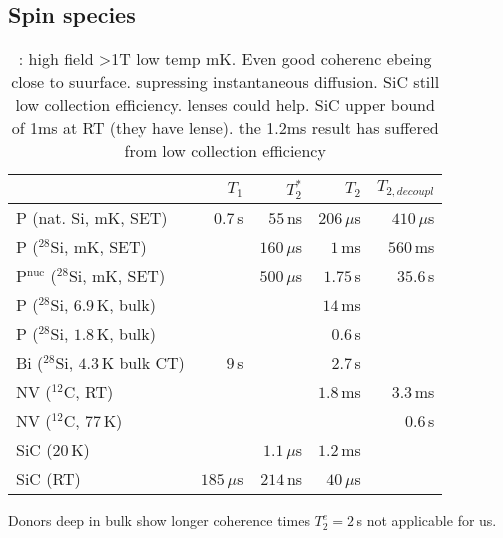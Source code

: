
\subsection{Spin species}


\begin{table}[H]
\begin{tabular}{lrrrr}
	& $T_1$ & $T_2^{*}$ & $T_2$ & $T_{2, decoupl}$ \\ \hline
P (nat. Si, mK, SET) \cite{Pla2012}& $0.7\, $s & $55\, $ns  & $206\, \mu$s & $410\, \mu$s  \\
P ($^{28}$Si, mK, SET) \cite{Muhonen2014}&  & $160\, \mu$s  & $1\, $ms & $560\, $ms \\
P$^{\text{nuc}}$ ($^{28}$Si, mK, SET) \cite{Muhonen2014}& & $500\, \mu$s & $1.75\, $s & $35.6\, $s \\
P ($^{28}$Si, $6.9\, $K, bulk) \cite{Morley2010}& &  & $14\, $ms &  \\
P ($^{28}$Si, $1.8\, $K, bulk) \cite{Tyryshkin2011}& &  & $0.6\, $s &  \\
Bi ($^{28}$Si, $4.3\, $K bulk CT) \cite{Wolfowicz2013} & $9\, $s &  & $2.7\, $s &\\
NV ($^{12}$C, RT) \cite{Balasubramanian2009,Bar-Gill2013} & & & $1.8\, $ms & $3.3\, $ms \\
NV ($^{12}$C, $77\, $K) \cite{Bar-Gill2013} & & &  & $0.6\, $s \\
SiC ($20\, $K) \cite{Christle2014} & & $1.1\, \mu$s & $1.2\, $ms &  \\
SiC (RT) \cite{Koehl2011} & $185\, \mu$s & $214\, $ns & $40\, \mu$s &   \\
\hline
\end{tabular} 
\caption{\cite{Pla2012,Muhonen2014}: high field >1T low temp mK. Even good coherenc ebeing close to suurface. \cite{Tyryshkin2011} supressing instantaneous diffusion. SiC still low collection efficiency. lenses could help. SiC upper bound of 1ms at RT \cite{Widmann2014} (they have lense). the 1.2ms result has suffered from low collection efficiency}
\label{TAB:qubits}
\end{table}

Donors deep in bulk show longer coherence times $T_2^e=2\, $s \cite{Tyryshkin2011} not applicable for us.

